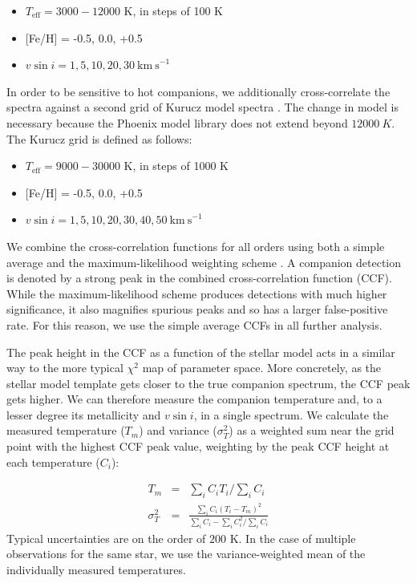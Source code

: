 \documentclass{emulateapj}
\begin{document}
\begin{itemize}
\item $T_\mathrm{eff} = 3000-12000$ K, in steps of 100 K
\item {[}Fe/H{]} = -0.5, 0.0, +0.5
\item $v\sin{i} = 1, 5, 10, 20, 30 \ \mathrm{km\ s}^{-1}$
\end{itemize}

In order to be sensitive to hot companions, we additionally cross-correlate the spectra against a second grid of Kurucz model spectra \citep{Castelli2003}. The change in model is necessary because the Phoenix model library does not extend beyond $12000\ K$. The Kurucz grid is defined as follows:

\begin{itemize}
\item $T_\mathrm{eff} = 9000-30000$ K, in steps of 1000 K
\item {[}Fe/H{]} = -0.5, 0.0, +0.5
\item $v\sin{i} = 1, 5, 10, 20, 30, 40, 50 \ \mathrm{km\ s}^{-1}$
\end{itemize}

We combine the cross-correlation functions for all orders using both a simple average and the maximum-likelihood weighting scheme \citep{Zucker2003}. A companion detection is denoted by a strong peak in the combined cross-correlation function (CCF). While the maximum-likelihood scheme produces detections with much higher significance, it also magnifies spurious peaks and so has a larger false-positive rate. For this reason, we use the simple average CCFs in all further analysis.

The peak height in the CCF as a function of the stellar model acts in a similar way to the more typical $\chi^2$ map of parameter space. More concretely, as the stellar model template gets closer to the true companion spectrum, the CCF peak gets higher. We can therefore measure the companion temperature and, to a lesser degree its metallicity and $v\sin{i}$, in a single spectrum. We calculate the measured temperature ($T_m$) and variance ($\sigma_T^2$) as a weighted sum near the grid point with the highest CCF peak value, weighting by the peak CCF height at each temperature ($C_i$):

\begin{eqnarray}
\label{eqn:tmeas} 
T_m &=& \sum_i C_i T_i / \sum_i C_i \\
\sigma_T^2 &=& \frac{\sum_i C_i (T_i - T_m)^2}{ \sum_i C_i - \sum_i C_i^2 / \sum_i C_i}
\end{eqnarray}
Typical uncertainties are on the order of $200$ K. In the case of multiple observations for the same star, we use the variance-weighted mean of the individually measured temperatures.
\end{document}
